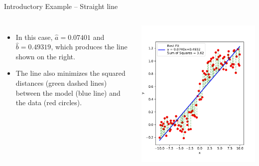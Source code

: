 \documentclass[10pt, aspectratio=169]{beamer} %
\begin{document}
\begin{frame}[allowframebreaks=0.8]{Introductory Example -- Straight line}
\begin{columns}
\begin{itemize}
\item In this case, $\hat{a} = 0.07401$ and $\hat{b} = 0.49319$,
which produces the line shown on the right.
\item The line also minimizes the squared distances (green dashed lines) 
between the model (blue line) and the data (red circles).
\end{itemize}
\centerline{\includegraphics[width=\textwidth]{LSEx1Solution.pdf}}
\end{columns}
\end{frame}
\end{document}
